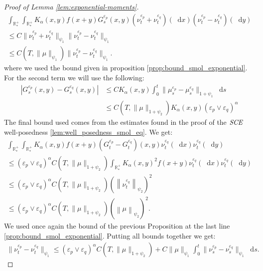 \documentclass[11pt,a4paper]{article}
\newcommand{\RRP}{\mathbb{R}^+_*}
\newcommand{\SCE}{\emph{SCE}}
\newcommand{\dd}{\mathop{}\!\mathrm{d}}
\begin{document}
\begin{proof}[Proof of Lemma \ref{lem:exponential-moments}]
    \begin{multline*}
        \int_{\RRP}\int_{\RRP}K_\alpha(x,y)f(x+y) G^{\varepsilon_p}_s(x,y)(\nu_t^{\varepsilon_p} + \nu_t^{\varepsilon_q})(\dd x)(\nu_t^{\varepsilon_p} -\nu_t^{\varepsilon_q} )(\dd y) \\
        \leq C\|\nu_t^{\varepsilon_p} + \nu_t^{\varepsilon_q} \|_{\psi_1 }  \|\nu_t^{\varepsilon_p} - \nu_t^{\varepsilon_q} \|_{\psi_1}\\
        \leq C (T,\|\mu\|_{\psi_1})\|\nu_t^{\varepsilon_p} - \nu_t^{\varepsilon_q} \|_{\psi_1}.
    \end{multline*}
    where we used the bound given in proposition \ref{prop:bound_smol_exponential}. For the second term we will use the following:
    \begin{align*}
        \left| G^{\varepsilon_p}_s(x,y) - G^{\varepsilon_q}_s(x,y) \right| &\leq CK_\alpha(x,y)\int_0^t \|\mu_s^{\varepsilon_p}-\mu_s^{\varepsilon_q}\|_{1 + \psi_1} \dd s \\
        &\leq C(T,\|\mu\|_{1 + \psi_2})K_\alpha(x,y) \left(\varepsilon_p \vee\varepsilon_q \right)^{\alpha}
    \end{align*}
    The final bound used comes from the estimates found in the proof of the $\SCE$ well-posedness \ref{lem:well_posedness_smol_eq}. We get:
    \begin{multline*}
        \int_{\RRP}\int_{\RRP}K_\alpha(x,y)f(x+y) (G^{\varepsilon_p}_t - G^{\varepsilon_q}_t)(x,y)\nu_t^{\varepsilon_q}(\dd x)\nu_t^{\varepsilon_q}(\dd y)\\
        \leq \left(\varepsilon_p \vee\varepsilon_q \right)^{\alpha}C(T,\|\mu\|_{1 + \psi_2})\int_{\RRP}K_\alpha(x,y)^2 f(x+y)\nu_t^{\varepsilon_q}(\dd x)\nu_t^{\varepsilon_q}(\dd y) \\
        \leq \left(\varepsilon_p \vee\varepsilon_q \right)^{\alpha}C(T,\|\mu\|_{1 + \psi_2}) \left(\left\|\nu_t^{\varepsilon_q}\right\|_{\psi_2}\right)^2 \\
        \leq \left(\varepsilon_p \vee\varepsilon_q \right)^{\alpha}C(T,\|\mu\|_{1 + \psi_2}) \left(\left\|\mu\right\|_{\psi_2}\right)^2.
    \end{multline*}
    We used once again the bound of the previous Proposition at the last line \ref{prop:bound_smol_exponential}. Putting all bounds together we get:
    \begin{align*}
        \| \nu_t^{\varepsilon_p}-\nu_t^{\varepsilon_q} \|_{\psi_1} \leq \left(\varepsilon_p \vee\varepsilon_q \right)^{\alpha}C(T,\|\mu\|_{1 + \psi_2})  + C\|\mu\|_{\psi_1}\int_0^t \| \nu_s^{\varepsilon_p}-\nu_s^{\varepsilon_q} \|_{\psi_1} \dd s.

\end{align*}
\end{proof}
\end{document}
